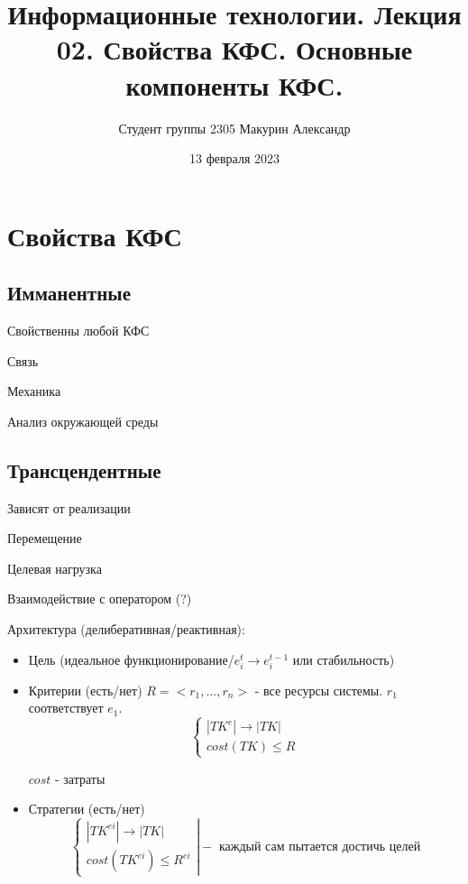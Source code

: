 \documentclass{article}
\title{Информационные технологии. Лекция 02. Свойства КФС. Основные компоненты КФС.}
\author{Студент группы 2305 Макурин Александр}
\date{13 февраля 2023}
\begin{document}
\maketitle
\begin{sloppypar}

    \section{Свойства КФС}
    \subsection{Имманентные}
    Свойственны любой КФС

    Связь

    Механика

    Анализ окружающей среды

    \subsection{Трансцендентные}
    Зависят от реализации

    Перемещение

    Целевая нагрузка

    Взаимодействие с оператором (?)

    Архитектура (делиберативная/реактивная):
    \begin{itemize}
        \item Цель (идеальное функционирование/$e_i^t \rightarrow e_i^{t - 1}$ или стабильность)
        \item Критерии (есть/нет)
              $R = <r_1, ..., r_n>$ - все ресурсы системы. $r_1$ соответствует $e_1$.
              \[
                  \left\{\begin{array}{ll}
                      |TK^e| \rightarrow |TK| \\
                      cost(TK) \leq R
                  \end{array}\right.
              \]

              $cost$ - затраты
        \item Стратегии (есть/нет)
              \[
                  \left\{\begin{array}{ll}
                      |TK^{ei}| \rightarrow |TK| \\
                      cost(TK^{ei}) \leq R^{ei}
                  \end{array}\right|
                  - \text{ каждый сам пытается достичь целей}
              \]


\end{itemize}
\end{sloppypar}
\end{document}
